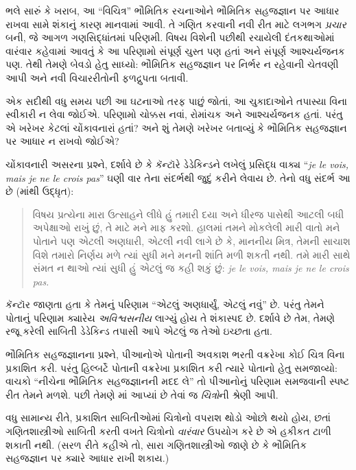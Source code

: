 ભલે સારું કે ખરાબ, આ “વિચિત્ર”
ભૌમિતિક રચનાઓને ભૌમિતિક
સહજજ્ઞાન પર આધાર રાખવા
સામે શંકાનું કારણ માનવામાં
આવી. તે ગણિત કરવાની
નવી રીત માટે લગભગ
\emph{પ્રચાર} બની,
જે આગળ ગણસિદ્ધાંતમાં
પરિણમી. વિષય વિશેની
પછીથી રચાયેલી
દંતકથાઓમાં વારંવાર
કહેવામાં આવતું કે
આ પરિણામો સંપૂર્ણ
ચુસ્ત પણ હતાં અને
સંપૂર્ણ આશ્ચર્યજનક
પણ. તેથી તેમણે
બેવડો હેતુ સાધ્યો:
ભૌમિતિક સહજજ્ઞાન
પર નિર્ભર ન રહેવાની
ચેતવણી આપી અને
નવી વિચારરીતોની
ફળદ્રુપતા બતાવી.
\endgroup

\begingroup
\makeatletter{}\makeatother


\label{guunit:OLP-0637}


એક સદીથી વધુ સમય પછી આ ઘટનાઓ તરફ
પાછું જોતાં, આ ચુકાદાઓને તપાસ્યા વિના
સ્વીકારી ન લેવા જોઈએ. પરિણામો ચોક્કસ
નવાં, રોમાંચક અને આશ્ચર્યજનક હતાં.
પરંતુ એ ખરેખર કેટલાં ચોંકાવનારાં હતાં?
અને શું તેમણે ખરેખર બતાવ્યું કે
ભૌમિતિક સહજજ્ઞાન પર આધાર ન રાખવો જોઈએ?

ચોંકાવનારી અસરના પ્રશ્ને,
\citet{Gouvea2011} દર્શાવે છે કે
કૅન્ટૉરે ડેડેકિન્ડને લખેલું પ્રસિદ્ધ
વાક્ય “\emph{je le vois, mais je ne le crois pas}”
ઘણી વાર તેના સંદર્ભથી જુદું કરીને લેવાય છે.
તેનો વધુ સંદર્ભ આ છે
(\citeauthor{Gouvea2011}માંથી ઉદ્ધૃત):
\begin{quote}
વિષય પ્રત્યેના મારા ઉત્સાહને લીધે
હું તમારી દયા અને ધીરજ પાસેથી
આટલી બધી અપેક્ષાઓ રાખું છું,
તે માટે મને માફ કરશો. હાલમાં
તમને મોકલેલી મારી વાતો મને
પોતાને પણ એટલી અણધારી,
એટલી નવી લાગે છે કે, માનનીય
મિત્ર, તેમની સાચાશ વિશે તમારો
નિર્ણય મળે ત્યાં સુધી મને
મનની શાંતિ મળી શકતી નથી.
તમે મારી સાથે સંમત ન થાઓ
ત્યાં સુધી હું એટલું જ કહી
શકું છું: \emph{je le vois, mais je ne le crois pas.}
\end{quote}
કૅન્ટૉર જાણતા હતા કે તેમનું
પરિણામ “એટલું અણધાર્યું,
એટલું નવું” છે. પરંતુ તેમને
પોતાનું પરિણામ ક્યારેય
\emph{અવિશ્વસનીય} લાગ્યું હોય
તે શંકાસ્પદ છે. \citeauthor{Gouvea2011}
દર્શાવે છે તેમ, તેમણે રજૂ કરેલી
સાબિતી ડેડેકિન્ડ તપાસી આપે
એટલું જ તેઓ ઇચ્છતા હતા.

ભૌમિતિક સહજજ્ઞાનના પ્રશ્ને,
પીઆનોએ પોતાની અવકાશ ભરતી
વક્રરેખા કોઈ ચિત્ર વિના
પ્રકાશિત કરી. પરંતુ હિલ્બર્ટે
પોતાની વક્રરેખા પ્રકાશિત
કરી ત્યારે પોતાનો હેતુ સમજાવ્યો:
વાચકો “નીચેના ભૌમિતિક
સહજજ્ઞાનની મદદ લે” તો
પીઆનોનું પરિણામ સમજવાની
સ્પષ્ટ રીત તેમને મળશે.
પછી તેમણે
માં
આપ્યાં છે તેવાં જ
\emph{ચિત્રો}ની શ્રેણી આપી.

વધુ સામાન્ય રીતે, પ્રકાશિત
સાબિતીઓમાં ચિત્રોનો વપરાશ
થોડો ઓછો થયો હોય, છતાં
ગણિતશાસ્ત્રીઓ સાબિતી કરતી
વખતે ચિત્રોનો \emph{વારંવાર}
ઉપયોગ કરે છે એ હકીકત
ટાળી શકાતી નથી. (સરળ
રીતે કહીએ તો, સારા
ગણિતશાસ્ત્રીઓ જાણે છે કે
ભૌમિતિક સહજજ્ઞાન પર
ક્યારે આધાર રાખી શકાય.)

